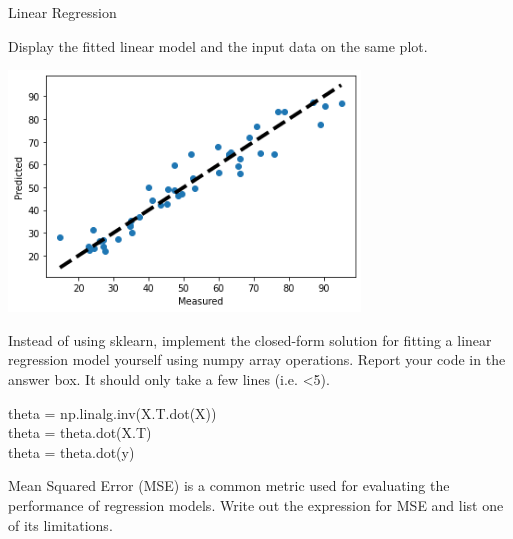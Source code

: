 \documentclass[12pt]{article}
\begin{document}
\begin{question}{Linear Regression}
    
%
%
\begin{subquestion}{Display the fitted linear model and the input data on the same plot.
}


\begin{answerbox}{35em}
\begin{center}
\includegraphics[width =0.7\textwidth]{linear_model.png}
\end{center}
\end{answerbox}



\end{subquestion}



%
%
\begin{subquestion}{Instead of using sklearn, implement the closed-form solution for fitting a linear regression model yourself using numpy array operations.  
Report your code in the answer box.
It should only take a few lines (i.e. <5).\\ 
}


\begin{answerbox}{20em}
theta = np.linalg.inv(X.T.dot(X))\\
theta = theta.dot(X.T)\\
theta = theta.dot(y)\\
\end{answerbox}



\end{subquestion}



%
%
\begin{subquestion}{Mean Squared Error (MSE) is a common metric used for evaluating the performance of regression models. 
Write out the expression for MSE and list one of its limitations. \\
}



\end{subquestion}
\end{question}
\end{document}
